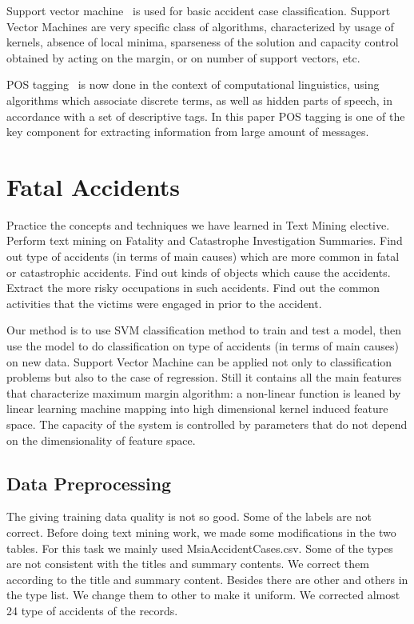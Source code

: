 \documentclass[DIV=calc, paper=a4, fontsize=11pt, twocolumn]{scrartcl}	 %
\begin{document}
Support vector machine~\cite{svm} is used for basic accident case
classification. Support Vector Machines are very specific class of
algorithms, characterized by usage of kernels, absence of local
minima, sparseness of the solution and capacity control obtained by
acting on the margin, or on number of support vectors, etc.

POS tagging~\cite{pos} is now done in the context of computational linguistics,
using algorithms which associate discrete terms, as well as hidden
parts of speech, in accordance with a set of descriptive tags. In this
paper POS tagging is one of the key component for extracting
information from large amount of messages.




\section{Fatal Accidents}
Practice the concepts and techniques we have learned in Text Mining
elective. Perform text mining on Fatality and Catastrophe
Investigation Summaries. Find out type of accidents (in terms of main
causes) which are more common in fatal or catastrophic accidents. Find
out kinds of objects which cause the accidents. Extract the more risky
occupations in such accidents. Find out the common activities that the
victims were engaged in prior to the accident.

Our method is to use SVM classification method to train and
test a model, then use the model to do classification on type of
accidents (in terms of main causes) on new data. Support Vector
Machine can be applied not only to classification problems but also to
the case of regression. Still it contains all the main features that
characterize maximum margin algorithm: a non-linear function is leaned
by linear learning machine mapping into high dimensional kernel
induced feature space. The capacity of the system is controlled by
parameters that do not depend on the dimensionality of feature space.




\subsection{Data Preprocessing}
The giving training data quality is not so good. Some of the labels
are not correct. Before doing text mining work, we made some
modifications in the two tables. For this task we mainly used
MsiaAccidentCases.csv. Some of the types are not consistent with the
titles and summary contents. We correct them according to the title
and summary content. Besides there are other and others in the type
list. We change them to other to make it uniform. We corrected almost 24
type of accidents of the records.
\end{document}
